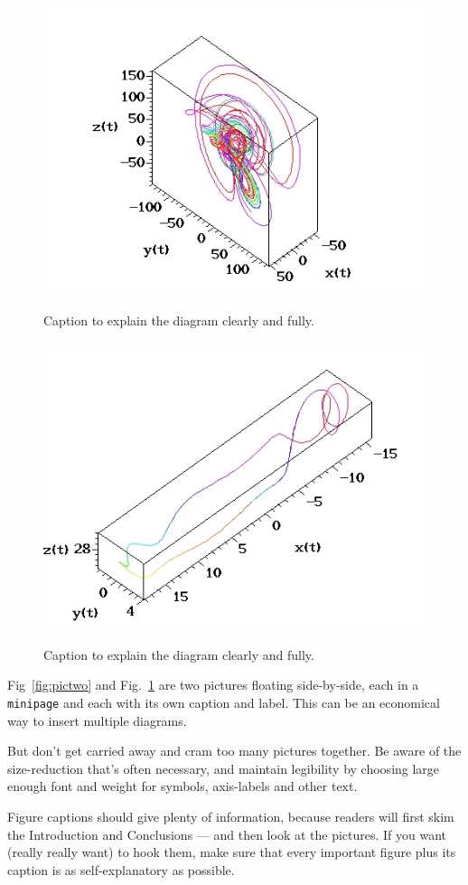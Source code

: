 \begin{figure}[ht]\centering
\begin{minipage}[c]{.45\textwidth}\centering
  \includegraphics[width=.95\textwidth]{pic4.jpg}
  \caption{Caption to explain the diagram 
clearly and fully.}\label{fig:pictwo}
\end{minipage}\hfill
\begin{minipage}[c]{.45\textwidth}\centering
  \includegraphics[width=.95\textwidth]{pic5.jpg}\\
  \caption{Caption to explain the diagram
clearly and fully.}\label{fig:picthree}
\end{minipage}
\end{figure}
Fig~\ref{fig:pictwo} and Fig.~\ref{fig:picthree} are two pictures
floating side-by-side, each in a \texttt{minipage} and each with its
own caption and label. This can be an economical way to insert multiple
diagrams.
\par
But don't get carried away and cram too many pictures together.
Be aware of the size-reduction that's often necessary, and maintain
legibility by choosing large enough font and weight for symbols,
axis-labels and other text.
\par
Figure captions should give plenty of information, because readers will
first skim the Introduction and Conclusions --- and then look at the
pictures. If you want (really really want) to hook them, make sure that
every important figure plus its caption is as self-explanatory as
possible.
%
